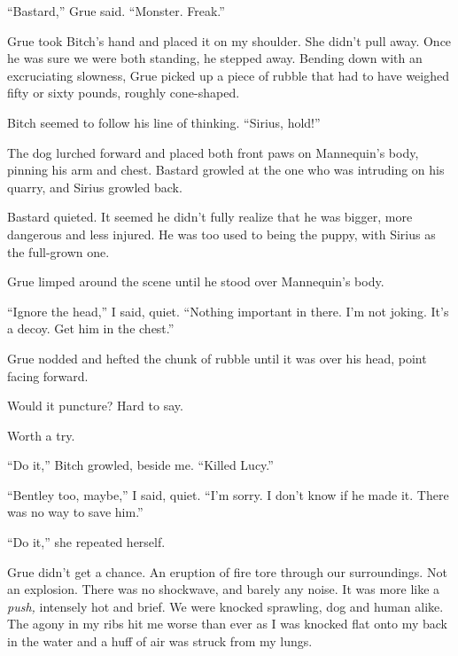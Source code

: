 ``Bastard,'' Grue said.  ``Monster.  Freak.''



Grue took Bitch's hand and placed it on my shoulder.  She didn't pull away.  Once he was sure we were both standing, he stepped away.  Bending down with an excruciating slowness, Grue picked up a piece of rubble that had to have weighed fifty or sixty pounds, roughly cone-shaped.



Bitch seemed to follow his line of thinking.  ``Sirius, hold!''



The dog lurched forward and placed both front paws on Mannequin's body, pinning his arm and chest. Bastard growled at the one who was intruding on his quarry, and Sirius growled back.



Bastard quieted.  It seemed he didn't fully realize that he was bigger, more dangerous and less injured.  He was too used to being the puppy, with Sirius as the full-grown one.



Grue limped around the scene until he stood over Mannequin's body.



``Ignore the head,'' I said, quiet.  ``Nothing important in there.  I'm not joking.  It's a decoy.  Get him in the chest.''



Grue nodded and hefted the chunk of rubble until it was over his head, point facing forward.



Would it puncture?  Hard to say.



Worth a try.



``Do it,'' Bitch growled, beside me.  ``Killed Lucy.''



``Bentley too, maybe,'' I said, quiet.  ``I'm sorry.  I don't know if he made it.  There was no way to save him.''



``Do it,'' she repeated herself.



Grue didn't get a chance.  An eruption of fire tore through our surroundings.  Not an explosion.  There was no shockwave, and barely any noise.  It was more like a \emph{push, }intensely hot and brief.  We were knocked sprawling, dog and human alike.  The agony in my ribs hit me worse than ever as I was knocked flat onto my back in the water and a huff of air was struck from my lungs.



